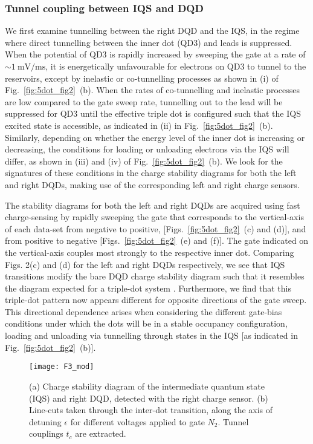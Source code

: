 \subsubsection{Tunnel coupling between IQS and DQD}
We first examine tunnelling between the right DQD and the IQS, in the regime where direct tunnelling between the inner dot (QD3) and leads is suppressed. When the potential of QD3 is rapidly increased by sweeping the gate at a rate of $\sim \SI{1}{\milli\volt\per\milli\second}$, it is energetically unfavourable for electrons on QD3 to tunnel to the reservoirs, except by inelastic or co-tunnelling processes as shown in (i) of Fig.~\ref{fig:5dot_fig2}~(b). When the rates of co-tunnelling and inelastic processes are low compared to the gate sweep rate, tunnelling out to the lead will be suppressed for QD3 until the effective triple dot is configured such that the IQS excited state is accessible, as indicated in (ii) in Fig.~\ref{fig:5dot_fig2}~(b). Similarly, depending on whether the energy level of the inner dot is increasing or decreasing, the conditions for loading or unloading electrons via the IQS will differ, as shown in (iii) and (iv) of Fig.~\ref{fig:5dot_fig2}~(b). We look for the signatures of these conditions in the charge stability diagrams for both the left and right DQDs, making use of the corresponding left and right charge sensors. 

The stability diagrams for both the left and right DQDs are acquired using fast charge-sensing by rapidly sweeping the gate that corresponds to the vertical-axis of each data-set from negative to positive, [Figs.~\ref{fig:5dot_fig2}~(c) and (d)], and from positive to negative [Figs.~\ref{fig:5dot_fig2}~(e) and (f)]. The gate indicated on the vertical-axis couples most strongly to the respective inner dot. Comparing Figs. 2(c) and (d) for the left and right DQDs respectively, we see that IQS transitions modify the bare DQD charge stability diagram such that it resembles the diagram expected for a triple-dot system \cite{tripledotstab}. Furthermore, we find that this triple-dot pattern now appears different for opposite directions of the gate sweep. This directional dependence arises when considering the different gate-bias conditions under which the dots will be in a stable occupancy configuration, loading and unloading via tunnelling through states in the IQS [as indicated in Fig.~\ref{fig:5dot_fig2}~(b)]. 
\begin{figure}
\texttt{[image: F3\_mod]}
\caption{\label{fig:5dot_fig3} (a) Charge stability diagram of the intermediate quantum state (IQS) and right DQD, detected with the right charge sensor. (b) Line-cuts taken through the inter-dot transition, along the axis of detuning $\epsilon$ for different voltages applied to gate $N_2$. Tunnel couplings $t_c$ are extracted.}
\end{figure}

